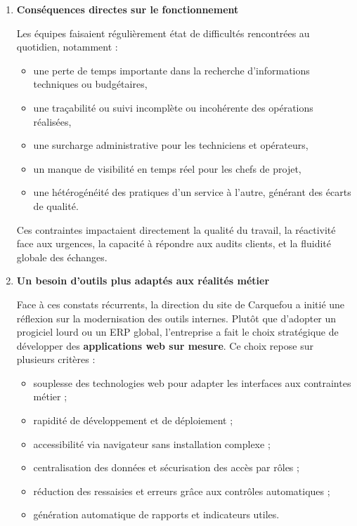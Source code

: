 \documentclass[11pt,a4paper]{article}
\begin{document}
\begin{enumerate}
\item \textbf{Conséquences directes sur le fonctionnement}

Les équipes faisaient régulièrement état de difficultés rencontrées au quotidien, notamment :

\begin{itemize}
    \item une perte de temps importante dans la recherche d’informations techniques ou budgétaires,
    \item une traçabilité ou suivi incomplète ou incohérente des opérations réalisées,
    \item une surcharge administrative pour les techniciens et opérateurs,
    \item un manque de visibilité en temps réel pour les chefs de projet,
    \item une hétérogénéité des pratiques d’un service à l’autre, générant des écarts de qualité.
\end{itemize}

Ces contraintes impactaient directement la qualité du travail, la réactivité face aux urgences, la capacité à répondre aux audits clients, et la fluidité globale des échanges.

\item \textbf{Un besoin d’outils plus adaptés aux réalités métier}

Face à ces constats récurrents, la direction du site de Carquefou a initié une réflexion sur la modernisation des outils internes. Plutôt que d’adopter un progiciel lourd ou un ERP global, l’entreprise a fait le choix stratégique de développer des \textbf{applications web sur mesure}. Ce choix repose sur plusieurs critères :

\begin{itemize}
    \item souplesse des technologies web pour adapter les interfaces aux contraintes métier ;
    \item rapidité de développement et de déploiement ;
    \item accessibilité via navigateur sans installation complexe ;
    \item centralisation des données et sécurisation des accès par rôles ;
    \item réduction des ressaisies et erreurs grâce aux contrôles automatiques ;
    \item génération automatique de rapports et indicateurs utiles.
\end{itemize}


\end{enumerate}
\end{document}

